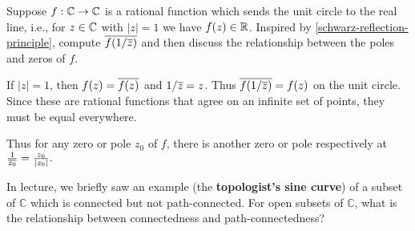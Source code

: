 \documentclass{homework}
\begin{document}
                                        \begin{problem}
                                        Suppose $f : \mathbb{C} \to \mathbb{C}$ is a rational function which
                                          sends the unit circle to the real line, i.e., for $z \in \mathbb{C}$ with
                                            $|z| = 1$ we have $f(z) \in \mathbb{R}$.  Inspired
                                              by \ref{schwarz-reflection-principle}, compute
                                                $\overline{f(1/\overline{z})}$ and then discuss the relationship between
                                                  the poles and zeros of $f$.
                                                  \end{problem}
                                                  \begin{solution}
                                                  If $|z|=1$, then $f(z)=\overline{f(z)}$ and $1/\overline{z} = z$. Thus
                                                  $\overline{f(1/\overline{z})} = f(z)$ on the unit circle. Since these are rational functions that agree on an infinite set of points, they must be equal everywhere.

                                                  Thus for any zero or pole $z_0$ of $f$, there is another zero or pole respectively at $\frac{1}{\overline{z_0}}= \frac{z_0}{|z_0|}.$
                                                  \end{solution}
                                                  \begin{problem}
                                                  In lecture, we briefly saw an example (the
                                                    \textbf{topologist's sine curve}) of a subset of $\mathbb{C}$ which
                                                      is connected but not path-connected.  For open subsets of
                                                        $\mathbb{C}$, what is the relationship between connectedness and
                                                          path-connectedness?
                                                          \end{problem}
\end{document}
